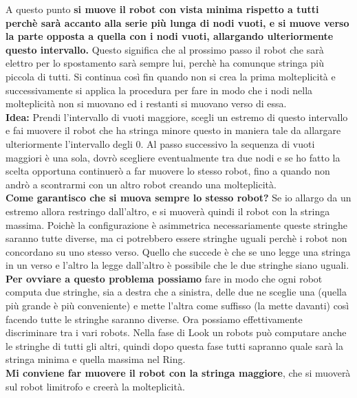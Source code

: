 A questo punto \textbf{si muove il robot con vista minima rispetto a tutti
    perchè sarà accanto alla serie più lunga di nodi vuoti, e si muove verso la
    parte opposta a quella con i nodi vuoti, allargando ulteriormente questo
    intervallo.} Questo significa che al prossimo passo il robot che sarà elettro
per lo spostamento sarà sempre lui, perchè ha comunque stringa più piccola di
tutti. Si continua così fin quando non si crea la prima molteplicità e
successivamente si applica la procedura per fare in modo che i nodi nella
molteplicità non si muovano ed i restanti si muovano verso di essa.\\

\textbf{Idea:} Prendi l'intervallo di vuoti maggiore, scegli un estremo di
questo intervallo e fai muovere il robot che ha stringa minore questo in maniera
tale da allargare ulteriormente l'intervallo degli 0. Al passo successivo la
sequenza di vuoti maggiori è una sola, dovrò scegliere eventualmente tra due
nodi e se ho fatto la scelta opportuna continuerò a far muovere lo stesso robot,
fino a quando non andrò a scontrarmi con un altro robot creando una
molteplicità.\\
\textbf{Come garantisco che si muova sempre lo stesso robot?} Se io allargo da
un estremo allora restringo dall'altro, e si muoverà quindi il robot con la
stringa massima. Poichè la configurazione è asimmetrica necessariamente queste
stringhe saranno tutte diverse, ma ci potrebbero essere stringhe uguali perchè i
robot non concordano su uno stesso verso. Quello che succede è che se uno legge
una stringa in un verso e l'altro la legge dall'altro è possibile che le due
stringhe siano uguali.\\
\textbf{Per ovviare a questo problema possiamo} fare in modo che ogni robot
computa due stringhe, sia a destra che a sinistra, delle due ne sceglie una
(quella più grande è più conveniente) e mette l'altra come suffisso (la mette
davanti) così facendo tutte le stringhe saranno diverse. Ora possiamo
effettivamente discriminare tra i vari robots. Nella fase di Look un robots può
computare anche le stringhe di tutti gli altri, quindi dopo questa fase tutti
sapranno quale sarà la stringa minima e quella massima nel Ring.\\
\textbf{Mi conviene far muovere il robot con la stringa maggiore}, che si
muoverà sul robot limitrofo e creerà la molteplicità.

